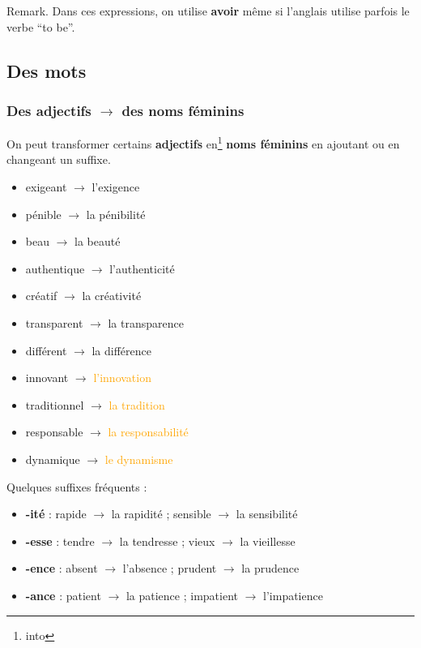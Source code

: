 \documentclass[math,code]{amznotes}
\theoremstyle{remark}
\begin{document}
\begin{notebox}
    Remark. Dans ces expressions, on utilise \textbf{avoir} même si l'anglais utilise parfois le verbe ``to be''.
\end{notebox}

\subsection*{Des mots}

\subsubsection*{Des adjectifs $\rightarrow$ des noms féminins}

On peut transformer certains \textbf{adjectifs} en\footnote{into} \textbf{noms féminins} en ajoutant ou en changeant un suffixe.

\begin{itemize}
    \item exigeant $\rightarrow$ l'exigence
    \item pénible $\rightarrow$ la pénibilité
    \item beau $\rightarrow$ la beauté
    \item authentique $\rightarrow$ l'authenticité
    \item créatif $\rightarrow$ la créativité
    \item transparent $\rightarrow$ la transparence
    \item différent $\rightarrow$ la différence
    \item innovant $\rightarrow$ \textcolor{orange}{l'innovation}
    \item traditionnel $\rightarrow$ \textcolor{orange}{la tradition}
    \item responsable $\rightarrow$ \textcolor{orange}{la responsabilité}
    \item dynamique $\rightarrow$ \textcolor{orange}{le dynamisme}
\end{itemize}


Quelques suffixes fréquents :
\begin{itemize}
    \item \textbf{-ité} : rapide $\rightarrow$ la rapidité ; sensible $\rightarrow$ la sensibilité
    \item \textbf{-esse} : tendre $\rightarrow$ la tendresse ; vieux $\rightarrow$ la vieillesse
    \item \textbf{-ence} : absent $\rightarrow$ l'absence ; prudent $\rightarrow$ la prudence
    \item \textbf{-ance} : patient $\rightarrow$ la patience ; impatient $\rightarrow$ l'impatience
\end{itemize}
\end{document}

